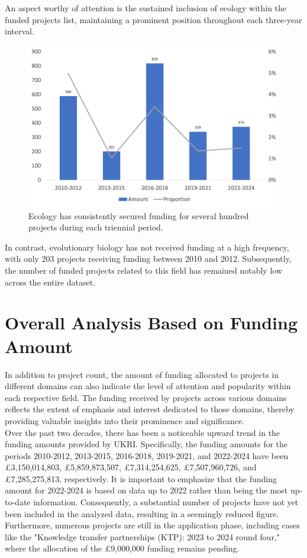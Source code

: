 An aspect worthy of attention is the sustained inclusion of ecology within the funded projects list, maintaining a prominent position throughout each three-year interval. 
\begin{figure}[H]
\centering
\includegraphics[scale=0.7]{Figures/Landscape of Ecology Funding.png}
\caption[Changing Landscape of Ecology Funding]{Ecology has consistently secured funding for several hundred projects during each triennial period.}
\label{figure} 
\end{figure}
In contrast, evolutionary biology has not received funding at a high frequency, with only 203 projects receiving funding between 2010 and 2012. Subsequently, the number of funded projects related to this field has remained notably low across the entire dataset.

\section*{Overall Analysis Based on Funding Amount}

In addition to project count, the amount of funding allocated to projects in different domains can also indicate the level of attention and popularity within each respective field. The funding received by projects across various domains reflects the extent of emphasis and interest dedicated to those domains, thereby providing valuable insights into their prominence and significance.\\

Over the past two decades, there has been a noticeable upward trend in the funding amounts provided by UKRI. Specifically, the funding amounts for the periods 2010-2012, 2013-2015, 2016-2018, 2019-2021, and 2022-2024 have been £3,150,014,803, £5,859,873,507, £7,314,254,625, £7,507,960,726, and £7,285,275,813, respectively. It is important to emphasize that the funding amount for 2022-2024 is based on data up to 2022 rather than being the most up-to-date information. Consequently, a substantial number of projects have not yet been included in the analyzed data, resulting in a seemingly reduced figure. Furthermore, numerous projects are still in the application phase, including cases like the "Knowledge transfer partnerships (KTP): 2023 to 2024 round four," where the allocation of the £9,000,000 funding remains pending.\\


